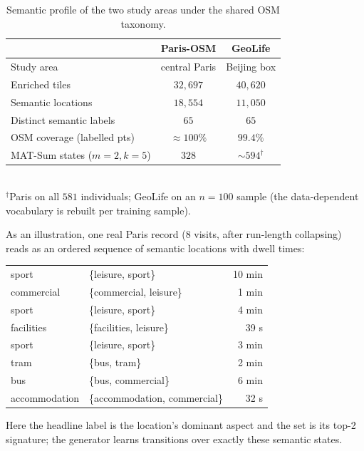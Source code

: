 \documentclass[sigconf,nonacm]{acmart}
\begin{document}
\begin{table}[t]
  \caption{Semantic profile of the two study areas under the shared OSM taxonomy.}
  \label{tab:semprofile}
  \small
  \begin{tabular}{@{}lcc@{}}
    \toprule
     & Paris-OSM & GeoLife \\
    \midrule
    Study area                 & central Paris & Beijing box \\
    Enriched tiles             & $32{,}697$ & $40{,}620$ \\
    Semantic locations         & $18{,}554$ & $11{,}050$ \\
    Distinct semantic labels   & $65$ & $65$ \\
    OSM coverage (labelled pts)& $\approx\!100\%$ & $99.4\%$ \\
    MAT-Sum states ($m{=}2,k{=}5$) & $328$ & $\sim\!594^{\dagger}$ \\
    \bottomrule
  \end{tabular}
  \\[2pt]\footnotesize $^{\dagger}$Paris on all $581$ individuals; GeoLife on an $n{=}100$ sample
  (the data-dependent vocabulary is rebuilt per training sample).
\end{table}

As an illustration, one real Paris record (8 visits, after run-length collapsing)
reads as an ordered sequence of semantic locations with dwell times:


\begin{center}\small\ttfamily
\begin{tabular}{@{}l l r@{}}
\hline
sport         & \{leisure, sport\}            & 10 min \\
commercial    & \{commercial, leisure\}       & \ 1 min \\
sport         & \{leisure, sport\}            & \ 4 min \\
facilities    & \{facilities, leisure\}       & 39 s   \\
sport         & \{leisure, sport\}            & \ 3 min \\
tram          & \{bus, tram\}                 & \ 2 min \\
bus           & \{bus, commercial\}           & \ 6 min \\
accommodation & \{accommodation, commercial\} & 32 s   \\
\hline
\end{tabular}
\end{center}

\noindent Here the headline label is the location's dominant aspect and the set is its
top-2 signature; the generator learns transitions over exactly these semantic states.
\end{document}
